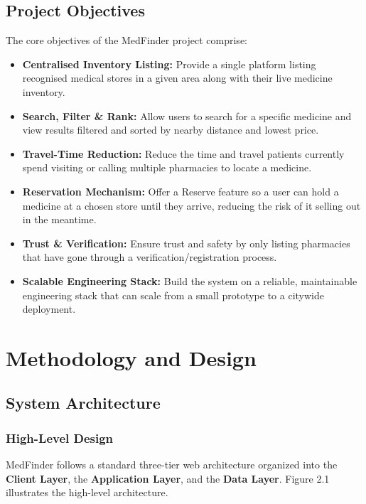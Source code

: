 \documentclass[11pt,a4paper]{report}
\begin{document}
\section{Project Objectives}

The core objectives of the MedFinder project comprise:

\begin{itemize}
    \item \textbf{Centralised Inventory Listing:} Provide a single platform listing recognised medical stores in a given area along with their live medicine inventory.
    \item \textbf{Search, Filter \& Rank:} Allow users to search for a specific medicine and view results filtered and sorted by nearby distance and lowest price.
    \item \textbf{Travel-Time Reduction:} Reduce the time and travel patients currently spend visiting or calling multiple pharmacies to locate a medicine.
    \item \textbf{Reservation Mechanism:} Offer a Reserve feature so a user can hold a medicine at a chosen store until they arrive, reducing the risk of it selling out in the meantime.
    \item \textbf{Trust \& Verification:} Ensure trust and safety by only listing pharmacies that have gone through a verification/registration process.
    \item \textbf{Scalable Engineering Stack:} Build the system on a reliable, maintainable engineering stack that can scale from a small prototype to a citywide deployment.
\end{itemize}

\chapter{Methodology and Design}

\section{System Architecture}

\subsection{High-Level Design}

MedFinder follows a standard three-tier web architecture organized into the \textbf{Client Layer}, the \textbf{Application Layer}, and the \textbf{Data Layer}. Figure 2.1 illustrates the high-level architecture.
\end{document}
